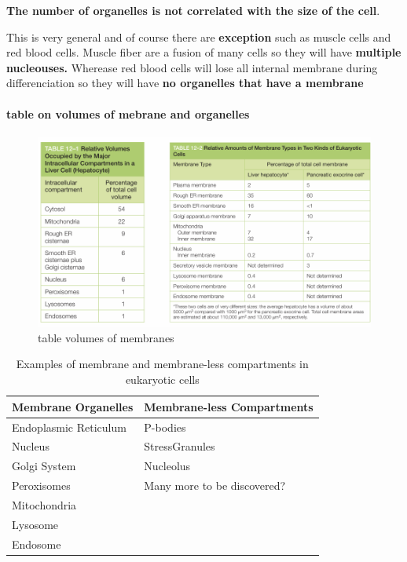 \documentclass[../main.tex]{subfiles}
\begin{document}
   \textbf{ The number of organelles is not correlated with the size of the cell}. 

   This is very general and of course there are \textbf{exception }such as muscle cells and red blood cells. Muscle fiber are a fusion of many cells so they will have\textbf{ multiple nucleouses. } Wherease red blood cells will lose all internal membrane during differenciation so they will have\textbf{ no organelles that have a membrane}

  \paragraph{table on volumes of mebrane and organelles}

  \begin{figure}[H]
      \centering
      \includegraphics[width=\linewidth]{TableVolumes.png}
      \caption{table volumes of membranes}
      \label{fig:enter-label}
  \end{figure}

\begin{table}[h!]
\centering
\begin{tabular}{|l|l|}
\hline
\textbf{Membrane Organelles} & \textbf{Membrane-less Compartments} \\
\hline
Endoplasmic Reticulum             & \gls{P-bodies}                             \\
Nucleus                           & \gls{StressGranules}                      \\
Golgi System                      & Nucleolus                            \\
Peroxisomes                       & Many more to be discovered?          \\
Mitochondria                      &                                      \\
Lysosome                          &                                      \\
Endosome                          &                                      \\
\hline
\end{tabular}
\caption{Examples of membrane and membrane-less compartments in eukaryotic cells}
\end{table}
\end{document}
